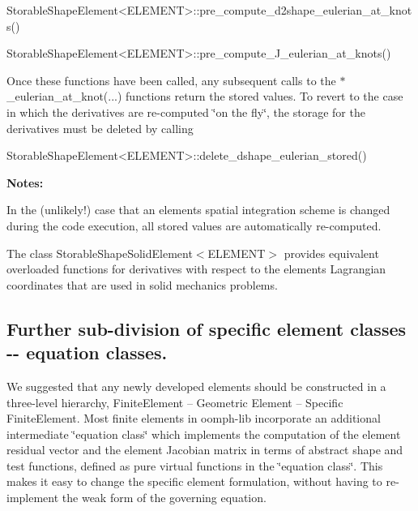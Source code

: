 \begin{DoxyCode}
StorableShapeElement<ELEMENT>::pre\_compute\_d2shape\_eulerian\_at\_knots()
\end{DoxyCode}
 
\begin{DoxyCode}
StorableShapeElement<ELEMENT>::pre\_compute\_J\_eulerian\_at\_knots()
\end{DoxyCode}
 Once these functions have been called, any subsequent calls to the {\ttfamily $\ast$\+\_\+eulerian\+\_\+at\+\_\+knot}(...) functions return the stored values. To revert to the case in which the derivatives are re-\/computed \char`\"{}on the fly\char`\"{}, the storage for the derivatives must be deleted by calling 
\begin{DoxyCode}
StorableShapeElement<ELEMENT>::delete\_dshape\_eulerian\_stored()
\end{DoxyCode}


{\bfseries Notes\+:} 
\begin{DoxyItemize}
\item In the (unlikely!) case that an element\textquotesingle{}s spatial integration scheme is changed during the code execution, all stored values are automatically re-\/computed.
\item The class {\ttfamily Storable\+Shape\+Solid\+Element$<$\+E\+L\+E\+M\+E\+N\+T$>$} provides equivalent overloaded functions for derivatives with respect to the element\textquotesingle{}s Lagrangian coordinates that are used in solid mechanics problems.
\end{DoxyItemize}



\hypertarget{index_equation_classes}{}\subsection{Further sub-\/division of specific element classes -\/-\/ equation classes.}\label{index_equation_classes}
We suggested that any newly developed elements should be constructed in a three-\/level hierarchy, {\ttfamily Finite\+Element} -- Geometric Element -- Specific {\ttfamily Finite\+Element}. Most finite elements in {\ttfamily oomph-\/lib} incorporate an additional intermediate \char`\"{}equation class\char`\"{} which implements the computation of the element residual vector and the element Jacobian matrix in terms of abstract shape and test functions, defined as pure virtual functions in the \char`\"{}equation class\char`\"{}. This makes it easy to change the specific element formulation, without having to re-\/implement the weak form of the governing equation.

